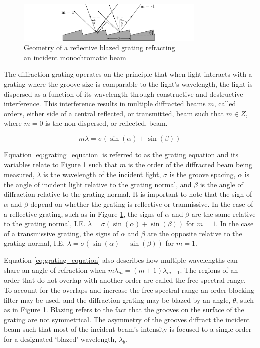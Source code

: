 \begin{figure}[t]
    \centering
    \includegraphics[width = 9cm]{figures/2_grating_diagram.pdf}
    \caption{Geometry of a reflective blazed grating refracting\\an incident monochromatic beam}
    \label{fig:grating_diagram}
\end{figure}

The diffraction grating operates on the principle that when light interacts with a grating where the groove size is comparable to the light's wavelength, the light is dispersed as a function of its wavelength through constructive and destructive interference. This interference results in multiple diffracted beams $m$, called orders, either side of a central reflected, or transmitted, beam such that $m \in Z$, where $m = 0$ is the non-dispersed, or reflected, beam.

\begin{equation}
	m\lambda = \sigma (\sin(\alpha) \pm \sin(\beta))
    \label{eq:grating_equation}
\end{equation}

Equation \ref{eq:grating_equation} is referred to as the grating equation and its variables relate to Figure \ref{fig:grating_diagram} such that $m$ is the order of the diffracted beam being measured, $\lambda$ is the wavelength of the incident light, $\sigma$ is the groove spacing, $\alpha$ is the angle of incident light relative to the grating normal, and $\beta$ is the angle of diffraction relative to the grating normal. It is important to note that the sign of $\alpha$ and $\beta$ depend on whether the grating is reflective or tranmissive. In the case of a reflective grating, such as in Figure \ref{fig:grating_diagram}, the signs of $\alpha$ and $\beta$ are the same relative to the grating normal, I.E. $\lambda = \sigma (\sin(\alpha) + \sin(\beta))$ for $m = 1$. In the case of a transmissive grating, the signs of $\alpha$ and $\beta$ are the opposite relative to the grating normal, I.E. $\lambda = \sigma (\sin(\alpha) - \sin(\beta))$ for $m = 1$.
\prgph

Equation \ref{eq:grating_equation} also describes how multiple wavelengths can share an angle of refraction when $m\lambda_{m} = (m + 1)\lambda_{m + 1}$. The regions of an order that do not overlap with another order are called the free spectral range. To account for the overlaps and increase the free spectral range an order-blocking filter may be used, and the diffraction grating may be blazed by an angle, $\theta$, such as in Figure \ref{fig:grating_diagram}. Blazing refers to the fact that the grooves on the surface of the grating are not symmetrical. The asymmetry of the grooves diffract the incident beam such that most of the incident beam's intensity is focused to a single order for a designated `blazed' wavelength, $\lambda_{b}$.

